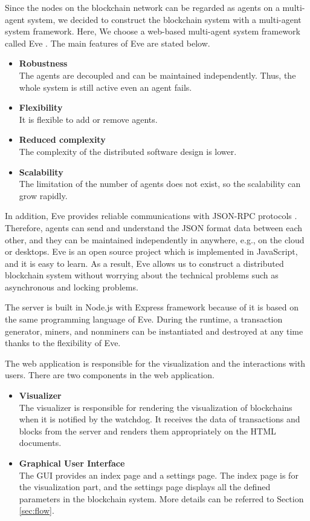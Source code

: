 Since the nodes on the blockchain network can be regarded as agents on a multi-agent system, we decided to construct the blockchain system with a multi-agent system framework. Here, We choose a web-based multi-agent system framework called Eve \cite{eve}. The main features of Eve are stated below.

\begin{itemize}
    \item \textbf{Robustness} \\
        The agents are decoupled and can be maintained independently. Thus, the whole system is still active even an agent fails.
    \item \textbf{Flexibility} \\
        It is flexible to add or remove agents.
    \item \textbf{Reduced complexity} \\
        The complexity of the distributed software design is lower.
    \item \textbf{Scalability} \\
        The limitation of the number of agents does not exist, so the scalability can grow rapidly.
\end{itemize}

In addition, Eve provides reliable communications with JSON-RPC protocols \cite{jsonrpc}. Therefore, agents can send and understand the JSON format data between each other, and they can be maintained independently in anywhere, e.g., on the cloud or desktops. Eve is an open source project which is implemented in JavaScript, and it is easy to learn. As a result, Eve allows us to construct a distributed blockchain system without worrying about the technical problems such as asynchronous and locking problems.

The server is built in Node.js with Express framework because of it is based on the same programming language of Eve. During the runtime, a transaction generator, miners, and nonminers can be instantiated and destroyed at any time thanks to the flexibility of Eve.

The web application is responsible for the visualization and the interactions with users. There are two components in the web application.

\begin{itemize}
    \item \textbf{Visualizer} \\
        The visualizer is responsible for rendering the visualization of blockchains when it is notified by the watchdog. It receives the data of transactions and blocks from the server and renders them appropriately on the HTML documents.
    \item \textbf{Graphical User Interface} \\
        The GUI provides an index page and a settings page. The index page is for the visualization part, and the settings page displays all the defined parameters in the blockchain system. More details can be referred to Section \ref{sec:flow}.
\end{itemize}

